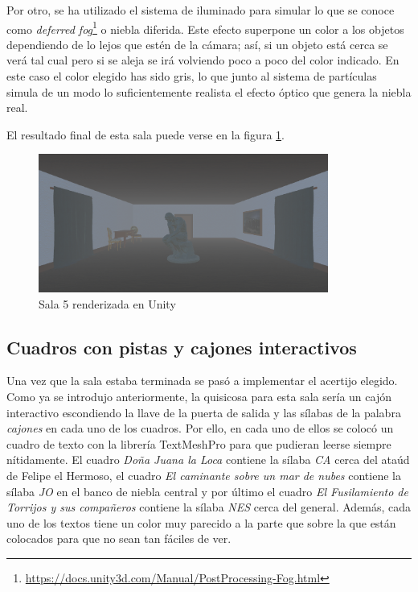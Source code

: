 Por otro, se ha utilizado el sistema de iluminado para simular lo que se conoce como \textit{deferred fog}\footnote{\url{https://docs.unity3d.com/Manual/PostProcessing-Fog.html}} o niebla diferida. Este efecto superpone un color a los objetos dependiendo de lo lejos que estén de la cámara; así, si un objeto está cerca se verá tal cual pero si se aleja se irá volviendo poco a poco del color indicado. En este caso el color elegido has sido gris, lo que junto al sistema de partículas simula de un modo lo suficientemente realista el efecto óptico que genera la niebla real.

El resultado final de esta sala puede verse en la figura \ref{fig:unity-sala-5}.

\begin{figure}[!h]
\begin{center}
\includegraphics[width=0.85\textwidth]{imagenes/7/salas-unity/unity-sala-5.png}
\caption{Sala 5 renderizada en Unity}
\label{fig:unity-sala-5}
\end{center}
\end{figure}

\subsection{Cuadros con pistas y cajones interactivos}

Una vez que la sala estaba terminada se pasó a implementar el acertijo elegido. Como ya se introdujo anteriormente, la quisicosa para esta sala sería un cajón interactivo escondiendo la llave de la puerta de salida y las sílabas de la palabra \textit{cajones} en cada uno de los cuadros. Por ello, en cada uno de ellos se colocó un cuadro de texto con la librería TextMeshPro para que pudieran leerse siempre nítidamente. El cuadro \textit{Doña Juana la Loca} contiene la sílaba \textit{CA} cerca del ataúd de Felipe el Hermoso, el cuadro \textit{El caminante sobre un mar de nubes} contiene la sílaba \textit{JO} en el banco de niebla central y por último el cuadro \textit{El Fusilamiento de Torrijos y sus compañeros} contiene la sílaba \textit{NES} cerca del general. Además, cada uno de los textos tiene un color muy parecido a la parte que sobre la que están colocados para que no sean tan fáciles de ver.

